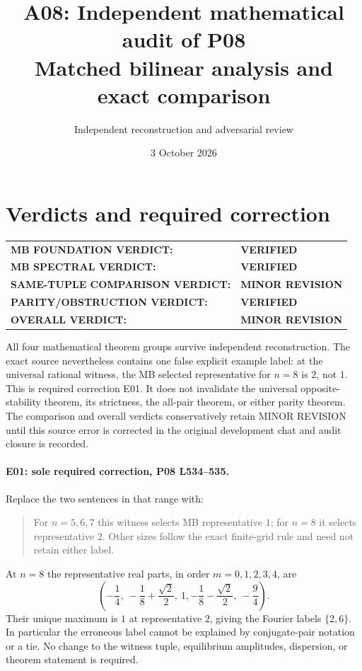 \documentclass[11pt]{article}
\title{A08: Independent mathematical audit of P08\\Matched bilinear analysis and exact comparison}
\author{Independent reconstruction and adversarial review}
\date{3 October 2026}
\newcommand{\lin}[1]{\textbf{L#1}}
\begin{document}
\maketitle

\section{Verdicts and required correction}
\begin{tabular}{@{}ll@{}}
\textbf{MB FOUNDATION VERDICT:}&\textbf{VERIFIED}\\
\textbf{MB SPECTRAL VERDICT:}&\textbf{VERIFIED}\\
\textbf{SAME-TUPLE COMPARISON VERDICT:}&\textbf{MINOR REVISION}\\
\textbf{PARITY/OBSTRUCTION VERDICT:}&\textbf{VERIFIED}\\
\textbf{OVERALL VERDICT:}&\textbf{MINOR REVISION}
\end{tabular}

All four mathematical theorem groups survive independent reconstruction.
The exact source nevertheless contains one false explicit example label:
at the universal rational witness, the MB selected representative for
$n=8$ is $2$, not $1$. This is required correction E01. It does not
invalidate the universal opposite-stability theorem, its strictness,
the all-pair theorem, or either parity theorem. The comparison and overall
verdicts conservatively retain MINOR REVISION until this source error is
corrected in the original development chat and audit closure is recorded.

\paragraph{E01: sole required correction, P08 \lin{534--535}.}
Replace the two sentences in that range with:
\begin{quote}
For $n=5,6,7$ this witness selects MB representative $1$; for $n=8$
it selects representative $2$. Other sizes follow the exact finite-grid
rule and need not retain either label.
\end{quote}
At $n=8$ the representative real parts, in order $m=0,1,2,3,4$, are
\[
 \left(-\frac14,\ -\frac18+\frac{\sqrt2}{2},\ 1,
             -\frac18-\frac{\sqrt2}{2},\ -\frac94\right).
\]
Their unique maximum is $1$ at representative $2$, giving the Fourier
labels $\{2,6\}$. In particular the erroneous label cannot be explained
by conjugate-pair notation or a tie. No change to the witness tuple,
equilibrium amplitudes, dispersion, or theorem statement is required.
\end{document}
